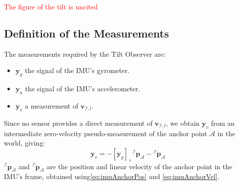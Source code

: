 \documentclass{IJCAS}
\begin{document}
\textcolor{red}{The figure of the tilt is uncited}

\subsection{Definition of the Measurements} \label{subsec:tiltMeas}
The measurements required by the Tilt Observer are:
\begin{itemize}
    \item $\boldsymbol{y}_{g}$ the signal of the IMU's gyrometer.
    \item $\boldsymbol{y}_{a}$ the signal of the IMU's accelerometer.
    \item $\boldsymbol{y}_{v}$ a measurement of $\boldsymbol{v}_{\mathcal{I}, l}$.
\end{itemize}
Since no sensor provides a direct measurement of $\boldsymbol{v}_{\mathcal{I}, l}$, we obtain $\boldsymbol{y}_{v}$ from an intermediate zero-velocity pseudo-measurement of the anchor point $\mathcal{A}$ in the world, giving:
\begin{equation}
    \boldsymbol{y}_v = - \left[\boldsymbol{y}_{g}\right]_{\times} {^{\mathcal{I}}}\boldsymbol{p}_{\mathcal{A}} - {^{\mathcal{I}}} \dot{\boldsymbol{p}}_{\mathcal{A}} \label{eq:yv}
\end{equation}
${^{\mathcal{I}}}\boldsymbol{p}_{\mathcal{A}}$ and ${^{\mathcal{I}}} \dot{\boldsymbol{p}}_{\mathcal{A}}$ are the position and linear velocity of the anchor point in the IMU's frame, obtained using\eqref{eq:imuAnchorPos} and \eqref{eq:imuAnchorVel}.
\end{document}
